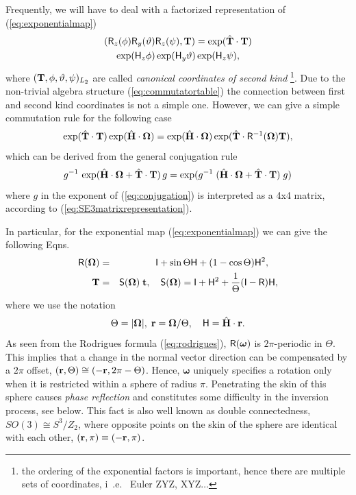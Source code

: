 \documentclass[conference]{IEEEtran}
\newcommand{\bfomega}{\boldsymbol{\omega}}
\newcommand{\bfOmega}{\boldsymbol{\Omega}}
\newcommand{\beq}{\begin{equation}}
\newcommand{\eeq}{\end{equation}}
\newcommand{\beqar}{\begin{eqnarray}}
\newcommand{\eeqar}{\end{eqnarray}}
\begin{document}
\begin{appendix}
Frequently, we will have to deal with a factorized representation of (\ref{eq:exponentialmap})
\begin{multline}
    ( {\sf R}_z(\phi){\sf R}_y(\vartheta){\sf R}_z(\psi),{\bf T}) = \exp( \hat{\bf T}\cdot {\bf T} ) \\
    \exp( {\sf H}_z\phi)\exp( {\sf H}_y\vartheta)\exp( {\sf H}_z\psi),
    \label{eq:Lie2ndkind}
\end{multline}
where $({\bf T},\phi,\vartheta,\psi)_{L_2}$ are called {\em canonical coordinates of second kind}
\footnote{the ordering of the exponential factors is important, hence there are multiple sets
of coordinates, i~.e.~ Euler ZYZ, XYZ$\ldots$}.
Due to the non-trivial algebra structure (\ref{eq:commutatortable}) the connection between first
and second kind coordinates is not a simple one.
However, we can give a simple commutation rule for the following case
\beq
    \exp(\hat{\bf T}\cdot{\bf T})\exp(\hat{\bf H}\cdot\bfOmega) =
    \exp(\hat{\bf H}\cdot\bfOmega)\exp(\hat{\bf T}\cdot{\sf R}^{-1}(\bfOmega){\bf T}),
    \label{eq:TOmegacommute}
\eeq
which can be derived from the general conjugation rule
\beq
    g^{-1}\,\exp(\hat{\bf H}\cdot\bfOmega+\hat{\bf T}\cdot{\bf T})\, g =
    \exp(g^{-1}\; (\hat{\bf H}\cdot\bfOmega+\hat{\bf T}\cdot{\bf T})\; g) \label{eq:conjugation}
\eeq
where $g$ in the exponent of (\ref{eq:conjugation}) is interpreted as a 4x4 matrix, according to
(\ref{eq:SE3matrixrepresentation}).

In particular, for the exponential map (\ref{eq:exponentialmap}) we can give the following
Eqns.~
\beqar
    {\sf R}(\bfOmega) &=& {\sf I}+\sin\Theta {\sf H} + (1-\cos\Theta){\sf H}^2,
    \quad \label{eq:rodrigues} \\
    {\bf T} &=& {\sf S}(\bfOmega)\; {\bf t},\quad
    {\sf S}(\bfOmega) = {\sf I} + {\sf H}^2 +  {1\over\Theta}({\sf I}-{\sf R}){\sf H}, \nonumber
\eeqar
where we use the notation
\beq
    \Theta=|\bfOmega|,\; {\bf r} = \bfOmega/\Theta,\quad
    {\sf H}=\hat{\bf H}\cdot{\bf r}. \label{eq:expnotation}
\eeq
As seen from the Rodrigues formula (\ref{eq:rodrigues}), ${\sf R}(\bfomega)$ is $2\pi$-periodic in $\Theta$.
This implies that a change in the normal vector direction can be compensated by a $2\pi$ offset, $({\bf r},\Theta) \cong (-{\bf r},2\pi-\Theta)$. Hence, $\bfomega$ uniquely specifies a rotation only when it is restricted within a sphere of radius $\pi$. Penetrating the skin of this sphere causes {\em phase reflection} and constitutes some difficulty in the inversion process, see below. This fact is also well known as double connectedness,
$SO(3) \cong S^3/Z_2$, where opposite points on the skin of the sphere are identical with each other,
$({\bf r},\pi) \equiv (-{\bf r},\pi)$.


\end{appendix}
\end{document}
